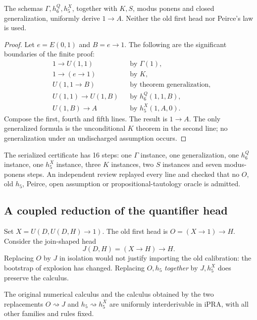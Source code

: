 \begin{lemma}
The schemas $\Gamma,h_6^Q,h_5^X$, together with $K,S$, modus ponens and
closed generalization, uniformly derive $1\to A$.  Neither the old first
head nor Peirce's law is used.
\end{lemma}

\begin{proof}
Let $e=E(0,1)$ and $B=e\to1$.  The following are the significant
boundaries of the finite proof:
\begin{align*}
 &1\to U(1,1) &&\text{by }\Gamma(1),\\
 &1\to(e\to1) &&\text{by }K,\\
 &U(1,1\to B) &&\text{by theorem generalization},\\
 &U(1,1)\to U(1,B) &&\text{by }h_6^Q(1,1,B),\\
 &U(1,B)\to A &&\text{by }h_5^X(1,A,0).
\end{align*}
Compose the first, fourth and fifth lines.  The result is $1\to A$.
The only generalized formula is the unconditional $K$ theorem in the
second line; no generalization under an undischarged assumption occurs.
\end{proof}

The serialized certificate has 16 steps: one $\Gamma$ instance, one
generalization, one $h_6^Q$ instance, one $h_5^X$ instance, three $K$
instances, two $S$ instances and seven modus-ponens steps.  An independent
review replayed every line and checked that no $O$, old $h_5$, Peirce,
open assumption or propositional-tautology oracle is admitted.

\subsection{A coupled reduction of the quantifier head}

Set $X=U(D,U(D,H)\to1)$.  The old first head is
$O=(X\to1)\to H$.  Consider the join-shaped head
\begin{equation}
                   J(D,H)=(X\to H)\to H. \label{eq:J}
\end{equation}
Replacing $O$ by $J$ in isolation would not justify importing the old
calibration: the bootstrap of explosion has changed.  Replacing $O,h_5$
\emph{together} by $J,h_5^X$ does preserve the calculus.

\begin{theorem}
The original numerical calculus and the calculus obtained by the two
replacements $O\rightsquigarrow J$ and $h_5\rightsquigarrow h_5^X$ are
uniformly interderivable in iPRA, with all other families and rules fixed.
\end{theorem}

